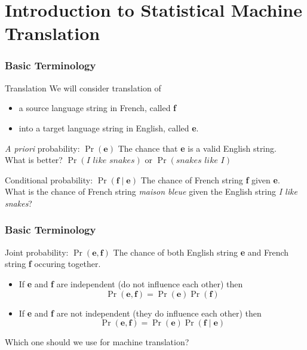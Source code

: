 





\section{Introduction to Statistical Machine Translation}
\frame{\tableofcontents[currentsection]}

\begin{frame}
\frametitle{Basic Terminology}
\begin{block}{Translation}
We will consider translation of 
\begin{itemize}
\item a source language string in French, called \textbf{f} 
\item into a target language string in English, called \textbf{e}.
\end{itemize}
\end{block}\pause
\begin{block}{\textit{A priori} probability: $\Pr(\textbf{e})$}
The chance that \textbf{e} is a valid English string.\\
What is better? $\Pr(\textit{I like snakes})$ or $\Pr(\textit{snakes like I})$
\end{block}\pause
\begin{block}{Conditional probability: $\Pr(\textbf{f} \mid \textbf{e})$}
The chance of French string \textbf{f} given \textbf{e}. \\
What is the chance of French string \textit{maison bleue} given the English string \textit{I like snakes}?
\end{block}
\end{frame}

\begin{frame}
\frametitle{Basic Terminology}
\begin{block}{Joint probability: $\Pr(\textbf{e}, \textbf{f})$}
The chance of both English string \textbf{e} and French string \textbf{f} occuring together.
\begin{itemize}[<+->]
\item If \textbf{e} and \textbf{f} are independent (do not influence each other) then 
\[ \Pr(\textbf{e}, \textbf{f}) = \Pr(\textbf{e}) \Pr(\textbf{f}) \]
\item If \textbf{e} and \textbf{f} are not independent (they do influence each other) then
\[ \Pr(\textbf{e}, \textbf{f}) = \Pr(\textbf{e}) \Pr(\textbf{f} \mid \textbf{e}) \]
\end{itemize}\pause
Which one should we use for machine translation?
\end{block}
\end{frame}

